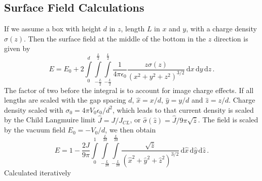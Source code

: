 \documentclass[a4paper,10pt]{article}
\newcommand{\ud}{\mathrm{d}}
\begin{document}
\subsection{Surface Field Calculations}
If we assume a box with height \(d\) in \(z\), length \(L\) in \(x\) and \(y\), with a charge density \(\sigma(z)\).
Then the surface field at the middle of the bottom in the \(z\) direction is given by
\begin{equation}
  E = E_0 + 2\int\limits_0^d\!\! \int\limits_{-\frac{L}{2}}^{\frac{L}{2}}\!\! \int\limits_{-\frac{L}{2}}^{\frac{L}{2}}\!\!
    \frac{1}{4\pi\epsilon_0} \frac{z \sigma(z)}{(x^2 + y^2 + z^2)^{3/2}}\, \ud x\, \ud y\, \ud z\, .
\end{equation}
The factor of two before the integral is to account for image charge effects.
If all lengths are scaled with the gap spacing \(d\), \(\hat{x} = x/d\), \(\hat{y} = y/d\) and \(\hat{z} = z/d\).
Charge density scaled with \(\sigma_0 = 4\pi V_0 \epsilon_0/d^2\), which leads to that current density is scaled
by the Child Langmuire limit \(\hat{J} = J/J_{CL}\), or \(\hat{\sigma}(\hat{z}) = \hat{J}/9\pi\sqrt{\hat{z}}\).
The field is scaled by the vacuum field \(E_0 = -V_0/d\), we then obtain
\begin{equation}
  E = 1 - \frac{2J}{9\pi}\int\limits_0^1\!\! \int\limits_{-\frac{L}{2d}}^{\frac{L}{2d}}\!\! \int\limits_{-\frac{L}{2d}}^{\frac{L}{2d}}\!\!
    \frac{\sqrt{\hat{z}}}{(\hat{x}^2 + \hat{y}^2 + \hat{z}^2)^{3/2}}\, \ud \hat{x}\, \ud \hat{y}\, \ud \hat{z}\, .
\end{equation}
Calculated iteratively


\cleardoublepage
\end{document}
